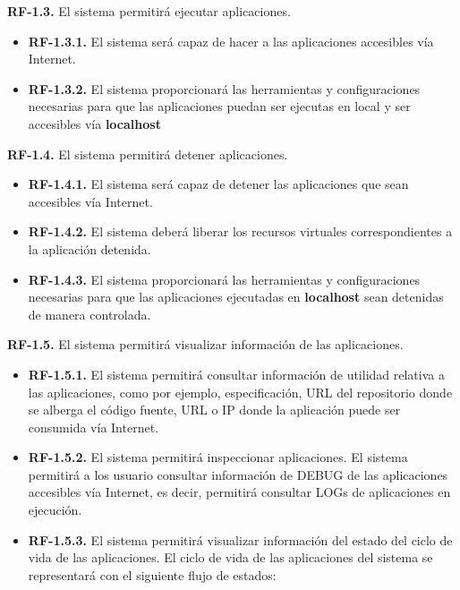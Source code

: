 \documentclass[a4paper,11pt]{book}
\begin{document}
\textbf{RF-1.3.} El sistema permitirá ejecutar aplicaciones.
\begin{itemize}
 \item \textbf{RF-1.3.1.} El sistema será capaz de hacer a las aplicaciones accesibles vía Internet.
 \item  \textbf{RF-1.3.2.} El sistema proporcionará las herramientas  y configuraciones necesarias para que las aplicaciones puedan ser ejecutas en local y ser accesibles vía \textbf{localhost}  \\
\end{itemize}


\textbf{RF-1.4.} El sistema permitirá detener aplicaciones.

\begin{itemize}
 \item  \textbf{RF-1.4.1.} El sistema será capaz de detener las aplicaciones que sean accesibles vía Internet.
  \item  \textbf{RF-1.4.2.} El sistema deberá liberar los recursos virtuales correspondientes a la aplicación detenida.
  \item  \textbf{RF-1.4.3.} El sistema proporcionará las herramientas  y configuraciones necesarias para que las aplicaciones ejecutadas en \textbf{localhost}  sean detenidas de manera controlada. \\
\end{itemize}

\textbf{RF-1.5.} El sistema permitirá visualizar información de las aplicaciones.

\begin{itemize}
\item \textbf{RF-1.5.1.} El sistema permitirá consultar  información de utilidad relativa a las aplicaciones,  como por ejemplo, especificación, URL del repositorio donde se alberga el código fuente, URL o IP donde la aplicación puede ser consumida vía Internet.
\item \textbf{RF-1.5.2.} El sistema permitirá inspeccionar aplicaciones. El sistema permitirá a los usuario consultar información de DEBUG de las aplicaciones accesibles vía Internet, es decir, permitirá consultar LOGs de aplicaciones en ejecución.
\item \textbf{RF-1.5.3.} El sistema permitirá visualizar información del estado del ciclo de vida de las aplicaciones. El ciclo de vida de las aplicaciones del sistema se representará con el siguiente flujo de estados:\\
\end{itemize}
\end{document}
